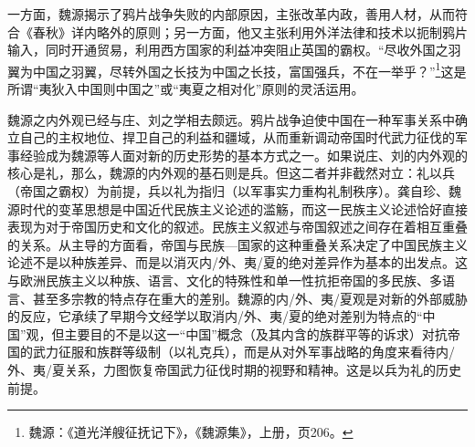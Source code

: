 \documentclass[a4paper, 12pt, openright]{ctexbook}
\begin{document}
一方面，魏源揭示了鸦片战争失败的内部原因，主张改革内政，善用人材，从而符合《春秋》详内略外的原则；另一方面，他又主张利用外洋法律和技术以扼制鸦片输入，同时开通贸易，利用西方国家的利益冲突阻止英国的霸权。“尽收外国之羽翼为中国之羽翼，尽转外国之长技为中国之长技，富国强兵，不在一举乎？”\footnote{魏源：《道光洋艘征抚记下》，《魏源集》，上册，页206。}这是所谓“夷狄入中国则中国之”或“夷夏之相对化”原则的灵活运用。

魏源之内外观已经与庄、刘之学相去颇远。鸦片战争迫使中国在一种军事关系中确立自己的主权地位、捍卫自己的利益和疆域，从而重新调动帝国时代武力征伐的军事经验成为魏源等人面对新的历史形势的基本方式之一。如果说庄、刘的内外观的核心是礼，那么，魏源的内外观的基石则是兵。但这二者并非截然对立：礼以兵（帝国之霸权）为前提，兵以礼为指归（以军事实力重构礼制秩序）。龚自珍、魏源时代的变革思想是中国近代民族主义论述的滥觞，而这一民族主义论述恰好直接表现为对于帝国历史和文化的叙述。民族主义叙述与帝国叙述之间存在着相互重叠的关系。从主导的方面看，帝国与民族—国家的这种重叠关系决定了中国民族主义论述不是以种族差异、而是以消灭内/外、夷/夏的绝对差异作为基本的出发点。这与欧洲民族主义以种族、语言、文化的特殊性和单一性抗拒帝国的多民族、多语言、甚至多宗教的特点存在重大的差别。魏源的内/外、夷/夏观是对新的外部威胁的反应，它承续了早期今文经学以取消内/外、夷/夏的绝对差别为特点的“中国”观，但主要目的不是以这一“中国”概念（及其内含的族群平等的诉求）对抗帝国的武力征服和族群等级制（以礼克兵），而是从对外军事战略的角度来看待内/外、夷/夏关系，力图恢复帝国武力征伐时期的视野和精神。这是以兵为礼的历史前提。
\end{document}
